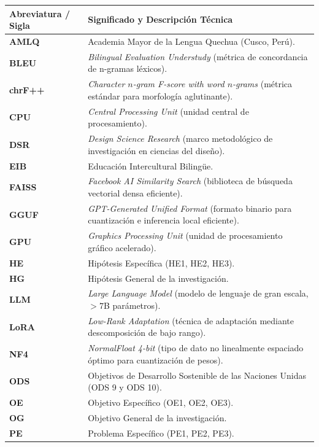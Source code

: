 \begin{table}[H]
\centering
\small
\begin{tabularx}{\textwidth}{@{}p{3.2cm}X@{}}
\toprule
\rowcolor{tcAzul!12}
\textbf{Abreviatura / Sigla} & \textbf{Significado y Descripción Técnica} \\
\midrule
\textbf{AMLQ} & Academia Mayor de la Lengua Quechua (Cusco, Perú). \\
\textbf{BLEU} & \textit{Bilingual Evaluation Understudy} (métrica de concordancia de n-gramas léxicos). \\
\textbf{chrF++} & \textit{Character $n$-gram F-score with word $n$-grams} (métrica estándar para morfología aglutinante). \\
\textbf{CPU} & \textit{Central Processing Unit} (unidad central de procesamiento). \\
\textbf{DSR} & \textit{Design Science Research} (marco metodológico de investigación en ciencias del diseño). \\
\textbf{EIB} & Educación Intercultural Bilingüe. \\
\textbf{FAISS} & \textit{Facebook AI Similarity Search} (biblioteca de búsqueda vectorial densa eficiente). \\
\textbf{GGUF} & \textit{GPT-Generated Unified Format} (formato binario para cuantización e inferencia local eficiente). \\
\textbf{GPU} & \textit{Graphics Processing Unit} (unidad de procesamiento gráfico acelerado). \\
\textbf{HE} & Hipótesis Específica (HE1, HE2, HE3). \\
\textbf{HG} & Hipótesis General de la investigación. \\
\textbf{LLM} & \textit{Large Language Model} (modelo de lenguaje de gran escala, $>7$B parámetros). \\
\textbf{LoRA} & \textit{Low-Rank Adaptation} (técnica de adaptación mediante descomposición de bajo rango). \\
\textbf{NF4} & \textit{NormalFloat 4-bit} (tipo de dato no linealmente espaciado óptimo para cuantización de pesos). \\
\textbf{ODS} & Objetivos de Desarrollo Sostenible de las Naciones Unidas (ODS 9 y ODS 10). \\
\textbf{OE} & Objetivo Específico (OE1, OE2, OE3). \\
\textbf{OG} & Objetivo General de la investigación. \\
\textbf{PE} & Problema Específico (PE1, PE2, PE3). \\

\end{tabularx}
\end{table}

